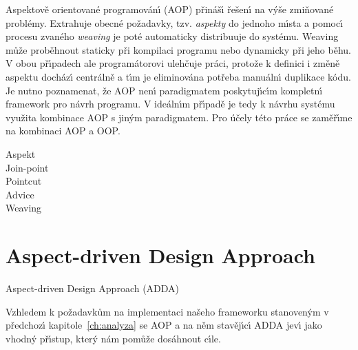 Aspektově orientované programován\'{\i} (\gls{AOP}) přináš\'{\i} řešen\'{\i} na
v\'yše zmiňované problémy. Extrahuje obecné požadavky,
tzv. \textit{aspekty} do jednoho m\'{\i}sta a pomoc\'{\i} procesu zvaného
\textit{weaving} je poté automaticky distribuuje do systému.
Weaving může proběhnout staticky při kompilaci programu nebo dynamicky
při jeho běhu. V obou př\'{\i}padech ale programátorovi ulehčuje práci,
protože k definici i změně aspektu docház\'{\i} centrálně a t\'{\i}m je eliminována
potřeba manuáln\'{\i} duplikace kódu. Je nutno poznamenat, že \gls{AOP} nen\'{\i}
paradigmatem poskytuj\'{\i}c\'{\i}m kompletn\'{\i} framework pro návrh programu.
V ideáln\'{\i}m př\'{\i}padě je tedy k návrhu systému využita kombinace
\gls{AOP} s jin\'ym paradigmatem. Pro účely této práce se zaměř\'{\i}me na
kombinaci \gls{AOP} a \gls{OOP}.


\begin{description}
    \item [Aspekt]
    \item [Join-point]
    \item [Pointcut]
    \item [Advice]
    \item [Weaving]
\end{description}

\section{Aspect-driven Design Approach}


Aspect-driven Design Approach (\gls{ADDA})

Vzhledem k požadavkům na implementaci našeho frameworku stanoven\'ym
v předchoz\'{\i} kapitole~\ref{ch:analyza} se \gls{AOP} a na něm stavěj\'{\i}c\'{\i} \gls{ADDA}
jev\'{\i} jako vhodn\'y př\'{\i}stup, kter\'y nám pomůže dosáhnout c\'{\i}le.

